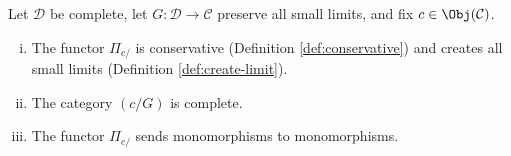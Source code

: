 \begin{proposition}\label{prop:comma-cat-completeness}
	Let $\mathcal{D}$ be complete, let $G:\mathcal{D}\to\mathcal{C}$ preserve
	all small limits, and fix $c\in\Obj(\mathcal{C})$.
	\begin{enumerate}[(i)]
		\item The functor $\Pi_{c/}$ is conservative (Definition
		\ref{def:conservative}) and creates all small limits (Definition
		\ref{def:create-limit}).
		\item The category $(c/G)$ is complete.
		\item The functor $\Pi_{c/}$ sends monomorphisms to monomorphisms.
	\end{enumerate}
\end{proposition}
